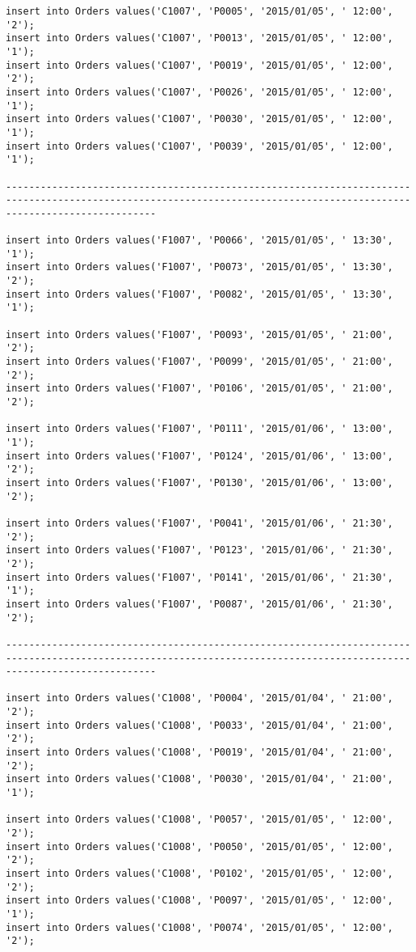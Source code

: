 \documentclass[a4,12pt]{report}
\begin{document}
\begin{lstlisting}
insert into Orders values('C1007', 'P0005', '2015/01/05', ' 12:00', '2');
insert into Orders values('C1007', 'P0013', '2015/01/05', ' 12:00', '1');
insert into Orders values('C1007', 'P0019', '2015/01/05', ' 12:00', '2');
insert into Orders values('C1007', 'P0026', '2015/01/05', ' 12:00', '1');
insert into Orders values('C1007', 'P0030', '2015/01/05', ' 12:00', '1');
insert into Orders values('C1007', 'P0039', '2015/01/05', ' 12:00', '1');

----------------------------------------------------------------------------------------------------------------------------------------------------------------------

insert into Orders values('F1007', 'P0066', '2015/01/05', ' 13:30', '1');
insert into Orders values('F1007', 'P0073', '2015/01/05', ' 13:30', '2');
insert into Orders values('F1007', 'P0082', '2015/01/05', ' 13:30', '1');

insert into Orders values('F1007', 'P0093', '2015/01/05', ' 21:00', '2');
insert into Orders values('F1007', 'P0099', '2015/01/05', ' 21:00', '2');
insert into Orders values('F1007', 'P0106', '2015/01/05', ' 21:00', '2');

insert into Orders values('F1007', 'P0111', '2015/01/06', ' 13:00', '1');
insert into Orders values('F1007', 'P0124', '2015/01/06', ' 13:00', '2');
insert into Orders values('F1007', 'P0130', '2015/01/06', ' 13:00', '2');

insert into Orders values('F1007', 'P0041', '2015/01/06', ' 21:30', '2');
insert into Orders values('F1007', 'P0123', '2015/01/06', ' 21:30', '2');
insert into Orders values('F1007', 'P0141', '2015/01/06', ' 21:30', '1');
insert into Orders values('F1007', 'P0087', '2015/01/06', ' 21:30', '2');

----------------------------------------------------------------------------------------------------------------------------------------------------------------------

insert into Orders values('C1008', 'P0004', '2015/01/04', ' 21:00', '2');
insert into Orders values('C1008', 'P0033', '2015/01/04', ' 21:00', '2');
insert into Orders values('C1008', 'P0019', '2015/01/04', ' 21:00', '2');
insert into Orders values('C1008', 'P0030', '2015/01/04', ' 21:00', '1');

insert into Orders values('C1008', 'P0057', '2015/01/05', ' 12:00', '2');
insert into Orders values('C1008', 'P0050', '2015/01/05', ' 12:00', '2');
insert into Orders values('C1008', 'P0102', '2015/01/05', ' 12:00', '2');
insert into Orders values('C1008', 'P0097', '2015/01/05', ' 12:00', '1');
insert into Orders values('C1008', 'P0074', '2015/01/05', ' 12:00', '2');



\end{lstlisting}
\end{document}
